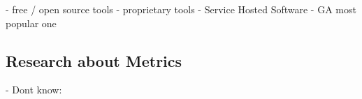 






- free / open source tools
- proprietary tools
- Service Hosted Software
- GA most popular one












\subsection{Research about Metrics}







- Dont know:























